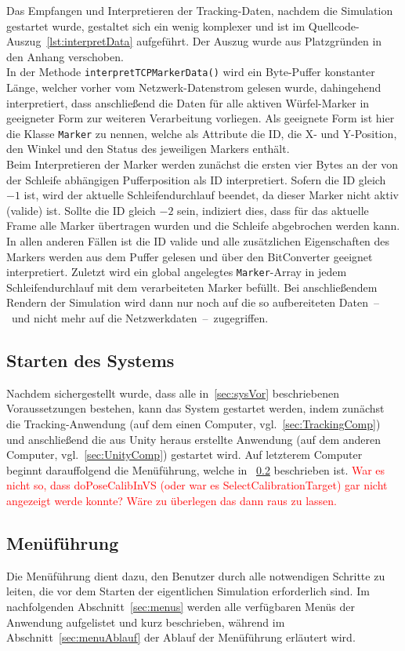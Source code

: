 Das Empfangen und Interpretieren der Tracking-Daten, nachdem die Simulation gestartet wurde, gestaltet sich ein wenig komplexer und ist im Quellcode-Auszug~\ref{lst:interpretData} aufgeführt. Der Auszug wurde aus Platzgründen in den Anhang verschoben.\\
In der Methode \texttt{interpretTCPMarkerData()} wird ein Byte-Puffer konstanter Länge, welcher vorher vom Netzwerk-Datenstrom gelesen wurde, dahingehend interpretiert, dass anschließend die Daten für alle aktiven Würfel-Marker in geeigneter Form zur weiteren Verarbeitung vorliegen. Als geeignete Form ist hier die Klasse \texttt{Marker} zu nennen, welche als Attribute die ID, die X- und Y-Position, den Winkel und den Status des jeweiligen Markers enthält.\\ 
Beim Interpretieren der Marker werden zunächst die ersten vier Bytes an der von der Schleife abhängigen Pufferposition als ID interpretiert. Sofern die ID gleich $-1$ ist, wird der aktuelle Schleifendurchlauf beendet, da dieser Marker nicht aktiv (valide) ist. Sollte die ID gleich $-2$ sein, indiziert dies, dass für das aktuelle Frame alle Marker übertragen wurden und die Schleife abgebrochen werden kann. In allen anderen Fällen ist die ID valide und alle zusätzlichen Eigenschaften des Markers werden aus dem Puffer gelesen und über den BitConverter geeignet interpretiert. Zuletzt wird ein global angelegtes \texttt{Marker}-Array in jedem Schleifendurchlauf mit dem verarbeiteten Marker befüllt. Bei anschließendem Rendern der Simulation wird dann nur noch auf die so aufbereiteten Daten~--~und nicht mehr auf die Netzwerkdaten~--~zugegriffen.

\subsection{Starten des Systems}
Nachdem sichergestellt wurde, dass alle in~\ref{sec:sysVor} beschriebenen Voraussetzungen bestehen, kann das System gestartet werden, indem zunächst die Tracking-Anwendung (auf dem einen Computer, vgl.~\ref{sec:TrackingComp}) und anschließend die aus Unity heraus erstellte Anwendung (auf dem anderen Computer, vgl.~\ref{sec:UnityComp}) gestartet wird. Auf letzterem Computer beginnt darauffolgend die Menüführung, welche in ~\ref{sec:menu} beschrieben ist. \textcolor{red}{War es nicht so, dass doPoseCalibInVS (oder war es SelectCalibrationTarget) gar nicht angezeigt werde konnte? Wäre zu überlegen das dann raus zu lassen.}
\subsection{Menüführung}\label{sec:menu}
Die Menüführung dient dazu, den Benutzer durch alle notwendigen Schritte zu leiten, die vor dem Starten der eigentlichen Simulation erforderlich sind. Im nachfolgenden Abschnitt~\ref{sec:menus} werden alle verfügbaren Menüs der Anwendung aufgelistet und kurz beschrieben, während im Abschnitt~\ref{sec:menuAblauf} der Ablauf der Menüführung erläutert wird.


